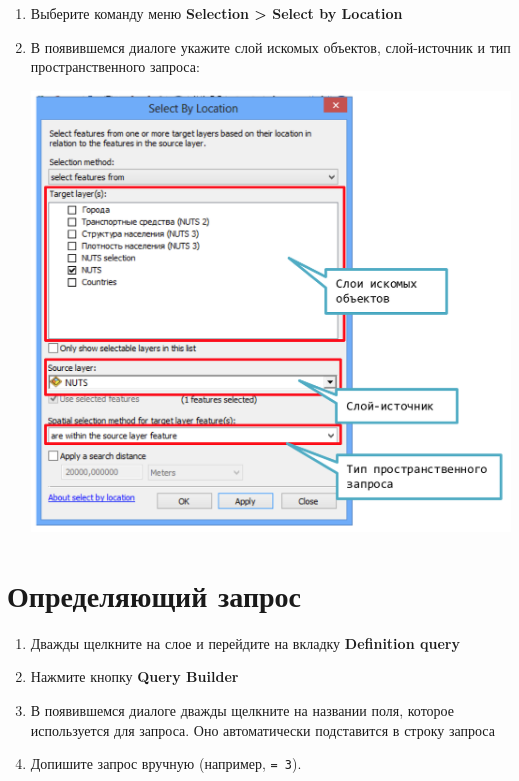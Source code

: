 \documentclass[]{book}
\theoremstyle{definition}
\theoremstyle{definition}
\theoremstyle{definition}
\theoremstyle{remark}
\begin{document}
\begin{enumerate}
\def\labelenumi{\arabic{enumi}.}
\item
  Выберите команду меню \textbf{Selection \textgreater{} Select by
  Location}
\item
  В появившемся диалоге укажите слой искомых объектов, слой-источник и
  тип пространственного запроса:

  \includegraphics{images/Appendix/image74.png}
\end{enumerate}

\hypertarget{manual-select-definition}{%
\section{Определяющий запрос}\label{manual-select-definition}}

\begin{enumerate}
\def\labelenumi{\arabic{enumi}.}
\item
  Дважды щелкните на слое и перейдите на вкладку \textbf{Definition
  query}
\item
  Нажмите кнопку \textbf{Query Builder}
\item
  В появившемся диалоге дважды щелкните на названии поля, которое
  используется для запроса. Оно автоматически подставится в строку
  запроса
\item
  Допишите запрос вручную (например, \texttt{=\ 3}).
\end{enumerate}
\end{document}
